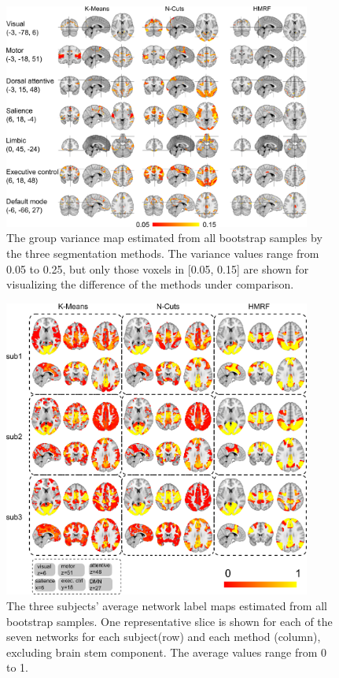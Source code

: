 \documentclass[review,authoryear]{elsarticle}
\begin{document}
\begin{figure}[htb]
  \centering
  \includegraphics[width=0.9\textwidth]{figures/varmap/grp_var}
  \caption{The group variance map estimated from all bootstrap samples by the
    three segmentation methods. The variance values range from 0.05 to 0.25, but
    only those voxels in [0.05, 0.15] are shown for visualizing the difference
    of the methods under comparison.  }
  \label{fig:grpvar}
\end{figure}

\begin{figure}[htb]
  \centering
  \includegraphics[width=0.9\textwidth]{figures/submean/submean}
  \caption{The three subjects' average network label maps estimated from all
    bootstrap samples. One representative slice is shown for each of the seven
    networks for each subject(row) and each method (column), excluding brain
    stem component. The average values range from 0 to 1. }
  \label{fig:submean}
\end{figure}
\end{document}
